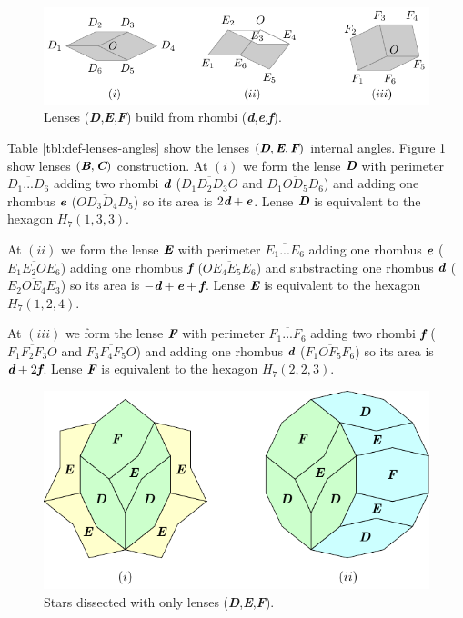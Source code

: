 \documentclass[11pt]{article}
\def\mathbi#1{\textbf{\em #1}}
\begin{document}
\begin{figure}[H]
\centering
\includegraphics[scale=1.1]{def/def}
\caption{Lenses (\mathbi{D},\mathbi{E},\mathbi{F}) build from rhombi (\mathbi{d},\mathbi{e},\mathbi{f}).}
\label{fig:def-hexagons}
\end{figure}


Table \ref{tbl:def-lenses-angles} show the lenses $(\mathbi{D},\mathbi{E},\mathbi{F})$ internal angles.
Figure \ref{fig:def-hexagons} show lenses $(\mathbi{B},\mathbi{C})$ construction.
At $(i)$ we form the lense $\mathbi{D}$ with perimeter $\overline{D_1...D_6}$ adding two rhombi $\mathbi{d}$ ($\overline{D_1D_2D_3O}$ and $\overline{D_1OD_5D_6}$) and adding one rhombus $\mathbi{e}$ ($\overline{OD_3D_4D_5}$) so its area is $2\mathbi{d} + \mathbi{e}$. Lense $\mathbi{D}$ is equivalent to the hexagon $H_7(1,3,3)$.

At $(ii)$ we form the lense $\mathbi{E}$ with perimeter $\overline{E_1...E_6}$ adding one rhombus $\mathbi{e}$ ($\overline{E_1E_2OE_6}$) adding one rhombus $\mathbi{f}$ ($\overline{OE_4E_5E_6}$) and substracting one rhombus $\mathbi{d}$ ($\overline{E_2OE_4E_3}$) so its area is $-\mathbi{d} + \mathbi{e} + \mathbi{f}$. Lense $\mathbi{E}$ is equivalent to the hexagon $H_7(1,2,4)$.

At $(iii)$ we form the lense $\mathbi{F}$ with perimeter $\overline{F_1...F_6}$ adding two rhombi $\mathbi{f}$ ($\overline{F_1F_2F_3O}$ and $\overline{F_3F_4F_5O}$) and adding one rhombus $\mathbi{d}$ ($\overline{F_1OF_5F_6}$) so its area is $\mathbi{d} + 2\mathbi{f}$. Lense $\mathbi{F}$ is equivalent to the hexagon $H_7(2,2,3)$.

\begin{figure}[H]
\centering
\includegraphics[scale=1.1]{def/def-stars-2}
\caption{Stars dissected with only lenses (\mathbi{D},\mathbi{E},\mathbi{F}).}
\label{fig:def-stars-2}
\end{figure}
\end{document}
